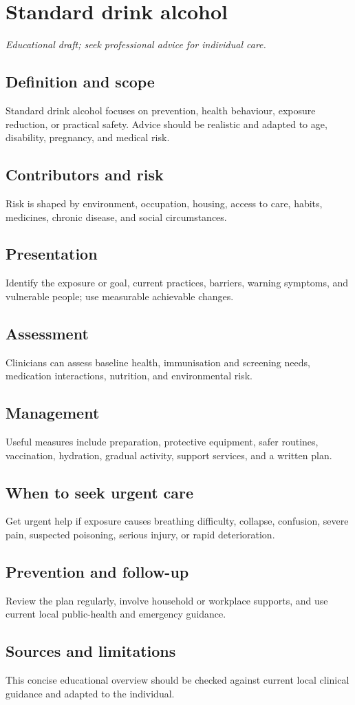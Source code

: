 \chapter{Standard drink alcohol}
\medskip
\noindent\textit{Educational draft; seek professional advice for individual care.}

\section*{Definition and scope}
Standard drink alcohol focuses on prevention, health behaviour, exposure reduction, or practical safety. Advice should be realistic and adapted to age, disability, pregnancy, and medical risk.

\section*{Contributors and risk}
Risk is shaped by environment, occupation, housing, access to care, habits, medicines, chronic disease, and social circumstances.

\section*{Presentation}
Identify the exposure or goal, current practices, barriers, warning symptoms, and vulnerable people; use measurable achievable changes.

\section*{Assessment}
Clinicians can assess baseline health, immunisation and screening needs, medication interactions, nutrition, and environmental risk.

\section*{Management}
Useful measures include preparation, protective equipment, safer routines, vaccination, hydration, gradual activity, support services, and a written plan.

\section*{When to seek urgent care}
Get urgent help if exposure causes breathing difficulty, collapse, confusion, severe pain, suspected poisoning, serious injury, or rapid deterioration.

\section*{Prevention and follow-up}
Review the plan regularly, involve household or workplace supports, and use current local public-health and emergency guidance.

\section*{Sources and limitations}
This concise educational overview should be checked against current local clinical guidance and adapted to the individual.
